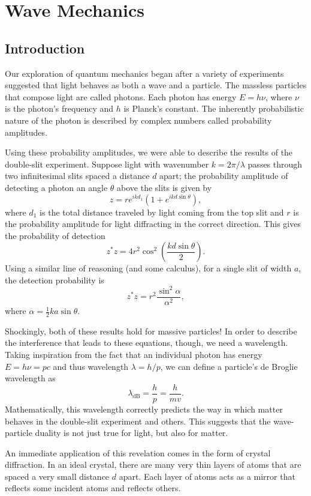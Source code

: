 \documentclass[../p052main.tex]{subfiles}
\begin{document}
\chapter{Wave Mechanics}
\section{Introduction}
Our exploration of quantum mechanics began after a variety of experiments suggested that light behaves as both a wave and a particle.
The massless particles that compose light are called photons.
Each photon has energy $E = h\nu$, where $\nu$ is the photon's frequency and $h$ is Planck's constant.
The inherently probabilistic nature of the photon is described by complex numbers called probability amplitudes.

Using these probability amplitudes, we were able to describe the results of the double-slit experiment.
Suppose light with wavenumber $k = 2\pi / \lambda$ passes through two infinitesimal slits spaced a distance $d$ apart; the probability amplitude of detecting a photon an angle $\theta$ above the slits is given by
\[ z = re^{ikd_1} \left( 1 + e^{ikd \sin \theta} \right), \]
where $d_1$ is the total distance traveled by light coming from the top slit and $r$ is the probability amplitude for light diffracting in the correct direction.
This gives the probability of detection
\[ z^*z = 4r^2 \cos^2 \left( \frac{kd \sin \theta}{2} \right). \]
Using a similar line of reasoning (and some calculus), for a single slit of width $a$, the detection probability is
\[ z^*z = r^2 \frac{\sin^2 \alpha}{\alpha^2}, \]
where $\alpha = \frac{1}{2}ka\sin\theta$.

Shockingly, both of these results hold for massive particles!
In order to describe the interference that leads to these equations, though, we need a wavelength.
Taking inspiration from the fact that an individual photon has energy $E = h\nu = pc$ and thus wavelength $\lambda = h/p$, we can define a particle's de Broglie wavelength as
\[ \lambda_\textrm{dB} = \frac{h}{p} = \frac{h}{mv}. \]
Mathematically, this wavelength correctly predicts the way in which matter behaves in the double-slit experiment and others.
This suggests that the wave-particle duality is not just true for light, but also for matter.

An immediate application of this revelation comes in the form of crystal diffraction.
In an ideal crystal, there are many very thin layers of atoms that are spaced a very small distance $d$ apart.
Each layer of atoms acts as a mirror that reflects some incident atoms and reflects others.
\end{document}
